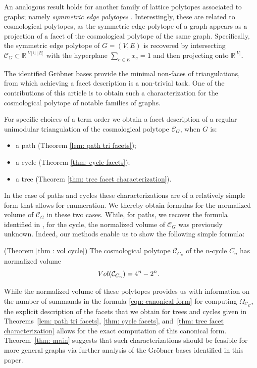 \documentclass[11pt]{article}
\theoremstyle{definition}
\numberwithin{equation}{section}
\begin{document}
An analogous result holds for another family of lattice polytopes associated to graphs; namely \emph{symmetric edge polytopes} \cite{HJM,FirstSEP}. Interestingly, these are related to cosmological polytopes, as the symmetric edge polytope of a graph appears as a projection of a facet of the cosmological polytope of the same graph.
Specifically, the symmetric edge polytope of $G=(V,E)$ is recovered by intersecting $\mathcal{C}_G\subset\mathbb{R}^{|V|\cup |E|}$ with the hyperplane $\sum_{e\in E}x_e =1$ and then projecting onto $\mathbb{R}^{|V|}$.

The identified Gr\"obner bases provide the minimal non-faces of triangulations, from which achieving a facet description is a non-trivial task. One of the contributions of this article is to obtain such a characterization for the cosmological polytope of notable families of graphs.
\begin{thmx}
    For specific choices of a term order we obtain a facet description of a regular unimodular triangulation of the cosmological polytope $\mathcal{C}_G$, when $G$ is:
\begin{itemize}
    \item[-] a path  (Theorem \ref{lem: path tri facets});
    \item[-] a cycle (Theorem \ref{thm: cycle facets});
    \item[-] a tree (Theorem \ref{thm: tree facet characterization}).
\end{itemize}
\end{thmx}
In the case of paths and cycles these characterizations are of a relatively simple form that allows for enumeration. 
We thereby obtain formulas for the normalized volume of $\mathcal{C}_G$ in these two  cases. While, for paths, we recover the formula identified in \cite{kuhne2022faces}, for the cycle, the normalized volume of $\mathcal{C}_G$ was previously unknown. Indeed, our methods enable us to show the following simple formula:
\begin{thmx} (Theorem \ref{thm : vol cycle})
    The cosmological polytope $\mathcal{C}_{C_n}$ of the $n$-cycle $C_n$ has normalized volume
    \[
        \textnormal{Vol}(\mathcal{C}_{C_n})=4^n-2^n.
    \]
\end{thmx}
While the normalized volume of these polytopes provides us with information on the number of summands in the formula \eqref{eqn: canonical form} for computing $\Omega_{\mathcal{C}_G}$, the explicit description of the facets that we obtain for trees and cycles given in Theorems~\ref{lem: path tri facets}, \ref{thm: cycle facets}, and~\ref{thm: tree facet characterization} allows for the exact computation of this canonical form.  
Theorem~\ref{thm: main} suggests that such characterizations should be feasible for more general graphs via further analysis of the Gr\"obner bases identified in this paper. 
\end{document}
